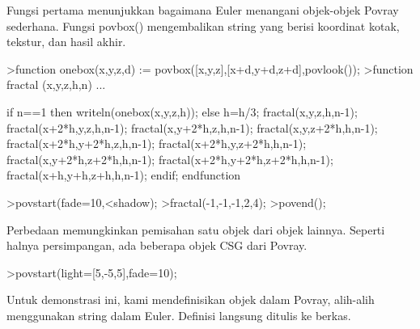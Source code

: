 \documentclass[a4paper,10pt]{article}
\begin{document}
\begin{eulernotebook}
\begin{eulercomment}
\begin{eulercomment}
\begin{eulercomment}
\begin{eulercomment}
\begin{eulercomment}
\begin{eulercomment}
\begin{eulercomment}
\begin{eulercomment}
\begin{eulercomment}
\begin{eulercomment}
\begin{eulercomment}
\begin{eulercomment}
\begin{eulercomment}
\begin{eulercomment}
\begin{eulercomment}
\begin{eulercomment}
\begin{eulercomment}
Fungsi pertama menunjukkan bagaimana Euler menangani objek-objek
Povray sederhana. Fungsi povbox() mengembalikan string yang berisi
koordinat kotak, tekstur, dan hasil akhir.
\end{eulercomment}
\begin{eulerprompt}
>function onebox(x,y,z,d) := povbox([x,y,z],[x+d,y+d,z+d],povlook());
>function fractal (x,y,z,h,n) ...
\end{eulerprompt}
\begin{eulerudf}
   if n==1 then writeln(onebox(x,y,z,h));
   else
     h=h/3;
     fractal(x,y,z,h,n-1);
     fractal(x+2*h,y,z,h,n-1);
     fractal(x,y+2*h,z,h,n-1);
     fractal(x,y,z+2*h,h,n-1);
     fractal(x+2*h,y+2*h,z,h,n-1);
     fractal(x+2*h,y,z+2*h,h,n-1);
     fractal(x,y+2*h,z+2*h,h,n-1);
     fractal(x+2*h,y+2*h,z+2*h,h,n-1);
     fractal(x+h,y+h,z+h,h,n-1);
   endif;
  endfunction
\end{eulerudf}
\begin{eulerprompt}
>povstart(fade=10,<shadow);
>fractal(-1,-1,-1,2,4);
>povend();
\end{eulerprompt}
\begin{eulercomment}
Perbedaan memungkinkan pemisahan satu objek dari objek lainnya.
Seperti halnya persimpangan, ada beberapa objek CSG dari Povray.
\end{eulercomment}
\begin{eulerprompt}
>povstart(light=[5,-5,5],fade=10);
\end{eulerprompt}
\begin{eulercomment}
Untuk demonstrasi ini, kami mendefinisikan objek dalam Povray,
alih-alih menggunakan string dalam Euler. Definisi langsung ditulis ke
berkas.


\end{eulercomment}
\end{eulercomment}
\end{eulercomment}
\end{eulercomment}
\end{eulercomment}
\end{eulercomment}
\end{eulercomment}
\end{eulercomment}
\end{eulercomment}
\end{eulercomment}
\end{eulercomment}
\end{eulercomment}
\end{eulercomment}
\end{eulercomment}
\end{eulercomment}
\end{eulercomment}
\end{eulercomment}
\end{eulernotebook}
\end{document}
